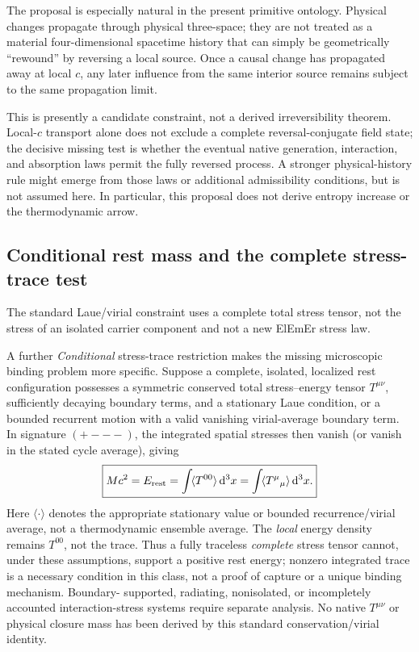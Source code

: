 \documentclass[11pt]{article}
\theoremstyle{definition}
\newcommand{\ElEmEr}{\mbox{ElEmEr}}
\newcommand{\dd}{\mathrm{d}}
\begin{document}
The proposal is especially natural in the present primitive ontology.  Physical changes
propagate through physical three-space; they are not treated as a material four-dimensional
spacetime history that can simply be geometrically ``rewound'' by reversing a local source.
Once a causal change has propagated away at local $c$, any later influence from the same
interior source remains subject to the same propagation limit.

This is presently a candidate constraint, not a derived irreversibility theorem.
Local-$c$ transport alone does not exclude a complete reversal-conjugate field state;
the decisive missing test is whether the eventual native generation, interaction, and
absorption laws permit the fully reversed process.  A stronger physical-history rule
might emerge from those laws or additional admissibility conditions, but is not assumed
here.  In particular, this proposal does not derive entropy increase or the
thermodynamic arrow.

\subsection{Conditional rest mass and the complete stress-trace test}
\label{subsec:stress-trace-mass}
The standard Laue/virial constraint \cite{Laue1911Dynamik,Giulini2018LaueRevisited}
uses a complete total stress tensor, not the
stress of an isolated carrier component and not a new \ElEmEr{} stress law.

A further \emph{Conditional} stress-trace restriction makes the missing microscopic
binding problem more specific.  Suppose a complete, isolated, localized rest
configuration possesses a symmetric conserved total stress--energy tensor
$T^{\mu\nu}$, sufficiently decaying boundary terms, and a stationary Laue
condition, or a bounded recurrent motion with a valid vanishing virial-average
boundary term.  In signature $(+---)$, the integrated spatial stresses then
vanish (or vanish in the stated cycle average), giving
\begin{equation}
 \boxed{Mc^2=E_{\rm rest}
   =\int\!\langle T^{00}\rangle\,\dd^3x
   =\int\!\langle T^\mu{}_{\mu}\rangle\,\dd^3x.}
 \label{eq:conditional_stress_trace_mass}
\end{equation}
Here $\langle\cdot\rangle$ denotes the appropriate stationary value or
bounded recurrence/virial average, not a thermodynamic ensemble average.
The \emph{local} energy density remains $T^{00}$, not the trace.  Thus a
fully traceless \emph{complete} stress tensor cannot, under these assumptions,
support a positive rest energy; nonzero integrated trace is a necessary condition
in this class, not a proof of capture or a unique binding mechanism.  Boundary-
supported, radiating, nonisolated, or incompletely accounted interaction-stress
systems require separate analysis.  No native $T^{\mu\nu}$ or physical closure
mass has been derived by this standard conservation/virial identity.
\end{document}
